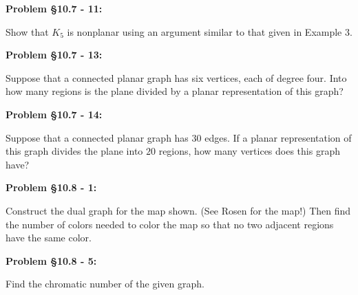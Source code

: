 \documentclass{article}
\newenvironment{problem}[1]
    {\begin{mdframed}[default]
    \textbf{Problem #1:}
    }
    {\end{mdframed}
    }
\begin{document}
\begin{problem}{\S 10.7 - 11}
Show that $K_5$ is nonplanar using an argument similar to that given in Example 3.
\end{problem}


\begin{problem}{\S 10.7 - 13}
Suppose that a connected planar graph has six vertices, each of degree four. Into how many regions is the plane divided by a planar representation of this graph?
\end{problem}


\begin{problem}{\S 10.7 - 14}
Suppose that a connected planar graph has $30$ edges. If a planar representation of this graph divides the plane into $20$ regions, how many vertices does this graph have?
\end{problem}


\begin{problem}{\S 10.8 - 1}
Construct the dual graph for the map shown. (See Rosen for the map!) Then find the number of colors needed to color the map so that no two adjacent regions have the same color.
\end{problem}


\begin{problem}{\S 10.8 - 5}
Find the chromatic number of the given graph.

\begin{center}
\end{center}
\end{problem}
\end{document}

